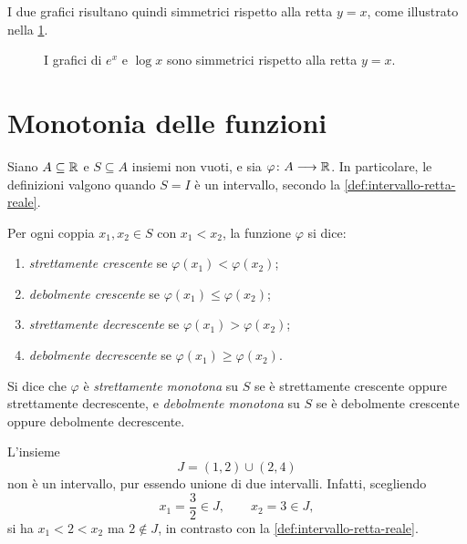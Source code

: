 \clearpage

I due grafici risultano quindi simmetrici rispetto alla retta
\(y=x\), come illustrato nella \cref{fig:lez10-grafico-inversa}.

\begin{figure}[htbp]
  \centering
  
  \caption{I grafici di \(e^x\) e \(\log x\) sono simmetrici
  rispetto alla retta \(y=x\).}
  \label{fig:lez10-grafico-inversa}
\end{figure}

\section{Monotonia delle funzioni}
\label{sec:lez10-monotonia}

Siano \(A\subseteq\mathbb{R}\) e \(S\subseteq A\) insiemi
non vuoti, e sia \(\varphi\colon A\longrightarrow\mathbb{R}\).
In particolare, le definizioni valgono quando \(S=I\)
è un intervallo, secondo la \cref{def:intervallo-retta-reale}.

\begin{definition}
\label{def:lez10-monotonia}
Per ogni coppia \(x_1,x_2\in S\) con \(x_1<x_2\),
la funzione \(\varphi\) si dice:
\begin{enumerate}
  \item \emph{strettamente crescente} se
  \(\varphi(x_1)<\varphi(x_2)\);
  \item \emph{debolmente crescente} se
  \(\varphi(x_1)\le\varphi(x_2)\);
  \item \emph{strettamente decrescente} se
  \(\varphi(x_1)>\varphi(x_2)\);
  \item \emph{debolmente decrescente} se
  \(\varphi(x_1)\ge\varphi(x_2)\).
\end{enumerate}
Si dice che \(\varphi\) è \emph{strettamente monotona} su \(S\)
se è strettamente crescente oppure strettamente decrescente,
e \emph{debolmente monotona} su \(S\) se è debolmente crescente
oppure debolmente decrescente.
\end{definition}

\begin{example}
\label{ex:lez10-unione-non-intervallo}
L'insieme
\[
  J=(1,2)\cup(2,4)
\]
non è un intervallo, pur essendo unione di due intervalli.
Infatti, scegliendo
\[
  x_1=\frac32\in J,
  \qquad x_2=3\in J,
\]
si ha \(x_1<2<x_2\) ma \(2\notin J\),
in contrasto con la \cref{def:intervallo-retta-reale}.
\end{example}

